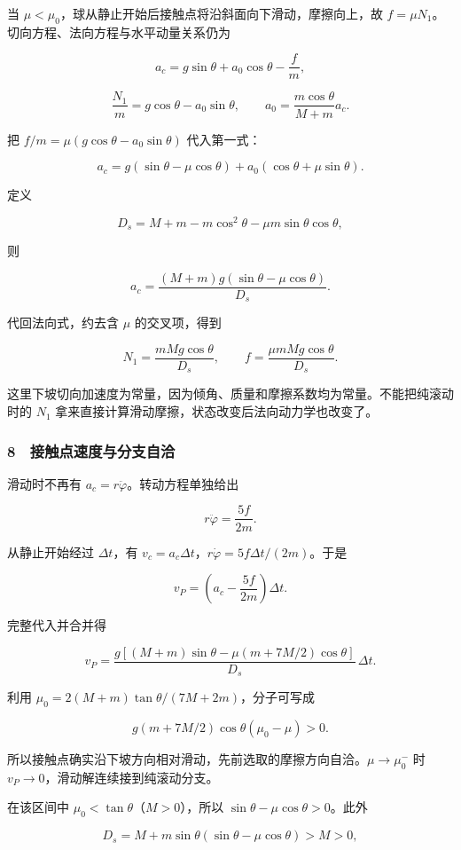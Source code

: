 \documentclass[12pt,a4paper,fontset=fandol]{ctexart}
\begin{document}
当 \(\mu<\mu_0\)，球从静止开始后接触点将沿斜面向下滑动，摩擦向上，故
\(f=\mu N_1\)。切向方程、法向方程与水平动量关系仍为

\[a_c=g\sin\theta+a_0\cos\theta-\frac fm,\]

\[\frac{N_1}{m}=g\cos\theta-a_0\sin\theta,\qquad
a_0=\frac{m\cos\theta}{M+m}a_c.\]

把 \(f/m=\mu(g\cos\theta-a_0\sin\theta)\) 代入第一式：

\[a_c=g(\sin\theta-\mu\cos\theta)
+a_0(\cos\theta+\mu\sin\theta).\]

定义

\[D_s=M+m-m\cos^2\theta-\mu m\sin\theta\cos\theta,\]

则

\[\boxed{a_c=\frac{(M+m)g(\sin\theta-\mu\cos\theta)}{D_s}.}\]

代回法向式，约去含 \(\mu\) 的交叉项，得到

\[\boxed{N_1=\frac{mMg\cos\theta}{D_s},\qquad
f=\frac{\mu mMg\cos\theta}{D_s}.}\]

这里下坡切向加速度为常量，因为倾角、质量和摩擦系数均为常量。不能把纯滚动时的
\(N_1\) 拿来直接计算滑动摩擦，状态改变后法向动力学也改变了。

\subsubsection{8　接触点速度与分支自洽}\label{ux63a5ux89e6ux70b9ux901fux5ea6ux4e0eux5206ux652fux81eaux6d3d}

滑动时不再有 \(a_c=r\ddot\varphi\)。转动方程单独给出

\[r\ddot\varphi=\frac{5f}{2m}.\]

从静止开始经过 \(\Delta t\)，有
\(v_c=a_c\Delta t\)，\(r\dot\varphi=5f\Delta t/(2m)\)。于是

\[v_P=\left(a_c-\frac{5f}{2m}\right)\Delta t.\]

完整代入并合并得

\[\boxed{v_P=
\frac{g[(M+m)\sin\theta-\mu(m+7M/2)\cos\theta]}{D_s}\,\Delta t.}\]

利用 \(\mu_0=2(M+m)\tan\theta/(7M+2m)\)，分子可写成

\[g(m+7M/2)\cos\theta(\mu_0-\mu)>0.\]

所以接触点确实沿下坡方向相对滑动，先前选取的摩擦方向自洽。\(\mu\to\mu_0^-\)
时 \(v_P\to0\)，滑动解连续接到纯滚动分支。

在该区间中 \(\mu_0<\tan\theta\)（\(M>0\)），所以
\(\sin\theta-\mu\cos\theta>0\)。此外

\[D_s=M+m\sin\theta(\sin\theta-\mu\cos\theta)>M>0,\]
\end{document}
